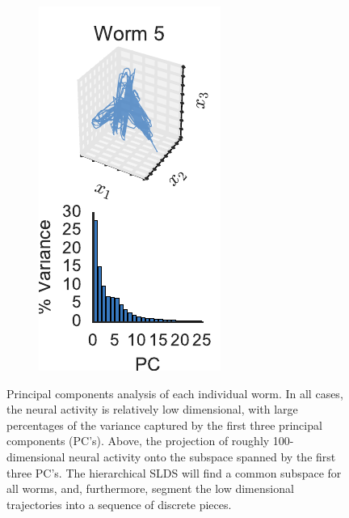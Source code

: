 \documentclass{article}
\begin{document}
\begin{figure}[t]
\begin{subfigure}[b]{.19\linewidth}
    \includegraphics[width=\textwidth]{pca_trajectory_worm4.pdf}
  \end{subfigure} 
  \caption{Principal components analysis of each individual worm.
    In all cases, the neural activity is relatively low dimensional,
    with large percentages of the variance captured by the first three
    principal components (PC's). Above, the projection of roughly 100-dimensional
    neural activity onto the subspace spanned by the first three PC's.
    The hierarchical SLDS will find a common subspace for all worms, and,
    furthermore, segment the low dimensional trajectories into a sequence
    of discrete pieces.}
\label{fig:pca_trajectory}
\end{figure}
\end{document}
